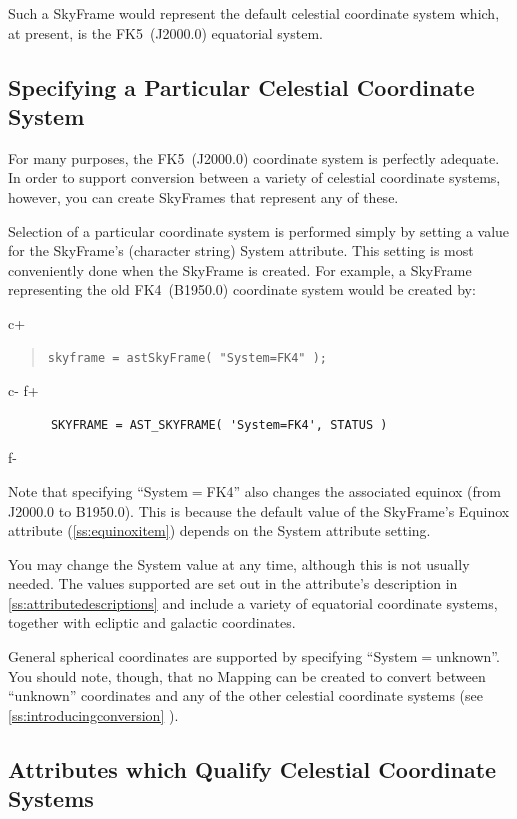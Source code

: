 \documentclass[twoside,11pt]{article}
\newcommand{\appref}[1]{Appendix~\ref{#1}}
\newcommand{\secref}[1]{\S\ref{#1}}
\renewcommand{\appref}[1]{\ref{#1}}
\renewcommand{\secref}[1]{\ref{#1}}
\begin{document}
Such a SkyFrame would represent the default celestial coordinate
system which, at present, is the FK5~(J2000.0) equatorial system.

\subsection{Specifying a Particular Celestial Coordinate System}

For many purposes, the FK5~(J2000.0) coordinate system is perfectly
adequate. In order to support conversion between a variety of
celestial coordinate systems, however, you can create SkyFrames that
represent any of these.

Selection of a particular coordinate system is performed simply by
setting a value for the SkyFrame's (character string) System
attribute. This setting is most conveniently done when the SkyFrame is
created. For example, a SkyFrame representing the old FK4~(B1950.0)
coordinate system would be created by:

c+
\begin{quote}
\small
\begin{verbatim}
skyframe = astSkyFrame( "System=FK4" );
\end{verbatim}
\normalsize
\end{quote}
c-
f+
\small
\begin{verbatim}
      SKYFRAME = AST_SKYFRAME( 'System=FK4', STATUS )
\end{verbatim}
\normalsize
f-

Note that specifying ``System$=$FK4'' also changes the associated
equinox (from J2000.0 to B1950.0). This is because the default value
of the SkyFrame's Equinox attribute (\secref{ss:equinoxitem}) depends
on the System attribute setting.

You may change the System value at any time, although this is not
usually needed.  The values supported are set out in the attribute's
description in \appref{ss:attributedescriptions} and include a variety
of equatorial coordinate systems, together with ecliptic and galactic
coordinates.

General spherical coordinates are supported by specifying
``System$=$unknown''. You should note, though, that no Mapping can be 
created to convert between ``unknown'' coordinates and any of the other 
celestial coordinate systems (see \secref{ss:introducingconversion} ).

\subsection{Attributes which Qualify Celestial Coordinate Systems}
\end{document}
